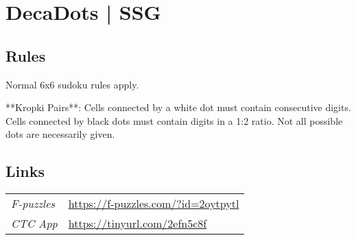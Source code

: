 \section{DecaDots | {\normalfont SSG}}
\label{sec:31-decadots-ssg}

\subsection*{Rules}
\begin{markdown}
Normal 6x6 sudoku rules apply.



**Kropki Pairs**: Cells connected by a white dot must contain consecutive digits. Cells connected by black dots must contain digits in a 1:2 ratio. Not all possible dots are necessarily given.
\end{markdown}
\subsection*{Links}
\begin{tabularx}{\textwidth}{l X}
\emph{F-puzzles} & \url{https://f-puzzles.com/?id=2oytpytl} \\
\emph{CTC App} & \url{https://tinyurl.com/2efn5c8f} \\
\end{tabularx}
\pagebreak
